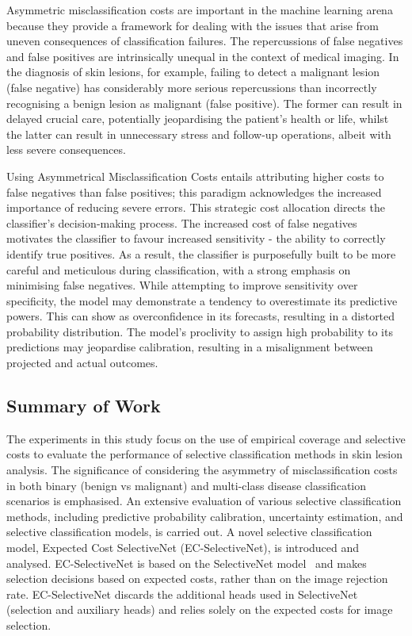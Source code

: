 Asymmetric misclassification costs are important in the machine learning arena because they provide a framework for dealing with the issues that arise from uneven consequences of classification failures. The repercussions of false negatives and false positives are intrinsically unequal in the context of medical imaging. In the diagnosis of skin lesions, for example, failing to detect a malignant lesion (false negative) has considerably more serious repercussions than incorrectly recognising a benign lesion as malignant (false positive). The former can result in delayed crucial care, potentially jeopardising the patient's health or life, whilst the latter can result in unnecessary stress and follow-up operations, albeit with less severe consequences.

Using Asymmetrical Misclassification Costs entails attributing higher costs to false negatives than false positives; this paradigm acknowledges the increased importance of reducing severe errors. This strategic cost allocation directs the classifier's decision-making process. The increased cost of false negatives motivates the classifier to favour increased sensitivity - the ability to correctly identify true positives. As a result, the classifier is purposefully built to be more careful and meticulous during classification, with a strong emphasis on minimising false negatives. While attempting to improve sensitivity over specificity, the model may demonstrate a tendency to overestimate its predictive powers. This can show as overconfidence in its forecasts, resulting in a distorted probability distribution. The model's proclivity to assign high probability to its predictions may jeopardise calibration, resulting in a misalignment between projected and actual outcomes.

\subsection{Summary of Work}
\label{subsec:selective_summary_of_work}
The experiments in this study focus on the use of empirical coverage and selective costs to evaluate the performance of selective classification methods in skin lesion analysis. The significance of considering the asymmetry of misclassification costs in both binary (benign vs malignant) and multi-class disease classification scenarios is emphasised. An extensive evaluation of various selective classification methods, including predictive probability calibration, uncertainty estimation, and selective classification models, is carried out. A novel selective classification model, Expected Cost SelectiveNet (EC-SelectiveNet), is introduced and analysed. EC-SelectiveNet is based on the SelectiveNet model~\citep{geifman2019selectivenet} and makes selection decisions based on expected costs, rather than on the image rejection rate. EC-SelectiveNet discards the additional heads used in SelectiveNet (selection and auxiliary heads) and relies solely on the expected costs for image selection.

